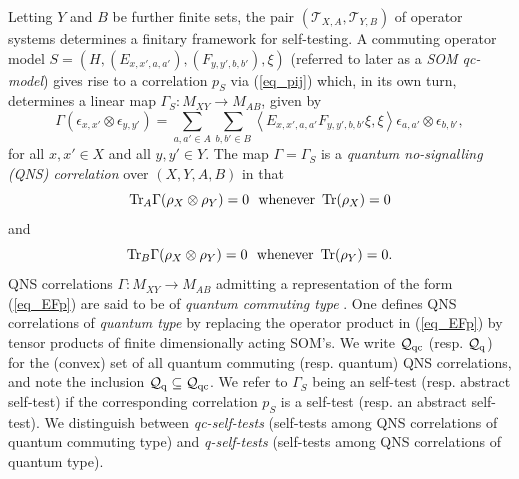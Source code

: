 \documentclass[11pt]{amsart}
\theoremstyle{definition}
\newcommand{\cl}[1]{\mathcal{#1}}
\DeclareMathOperator{\Tr}{Tr}
\begin{document}
Letting $Y$ and $B$ be further finite sets, 
the pair $(\cl T_{X,A},\cl T_{Y,B})$ of operator systems 
determines a finitary framework for self-testing. 
A commuting operator model 
$S = (H,(E_{x,x',a,a'}), (F_{y,y',b,b'}), \xi)$
(referred to later as a \emph{SOM qc-model})
gives rise to a correlation $p_S$ via (\ref{eq_pij}) which, 
in its own turn, determines a
linear map $\Gamma_S : M_{XY}\to M_{AB}$, given by 
\begin{equation}\label{eq_EFp}
\Gamma(\epsilon_{x,x'} \otimes \epsilon_{y,y'}) = \sum_{a,a'\in A} \sum_{b,b'\in B}
\left\langle E_{x,x',a,a'}F_{y,y',b,b'}\xi,\xi \right\rangle \epsilon_{a,a'} \otimes \epsilon_{b,b'}, 
\end{equation}
for all $x,x' \in X$ and all $y,y' \in Y$.
The map $\Gamma = \Gamma_S$ is a 
\emph{quantum no-signalling (QNS) correlation} over $(X,Y,A,B)$ 
\cite{dw} in that 
\begin{equation}\label{eq_NSQne1}
\Tr\hspace{-0.07cm}\mbox{}_A\Gamma(\rho_X\otimes \rho_Y) = 0 \ \mbox{ whenever } \Tr(\rho_X) = 0
\end{equation}
and
\begin{equation}\label{eq_NSQne2}
\Tr\hspace{-0.07cm}\mbox{}_B\Gamma(\rho_X\otimes \rho_Y) = 0 \ \mbox{ whenever } \Tr(\rho_Y) = 0.
\end{equation}
QNS correlations $\Gamma : M_{XY}\to M_{AB}$ admitting a 
representation of the form (\ref{eq_EFp}) are said to be of 
\emph{quantum commuting type} \cite{tt-QNS}.
One defines QNS correlations of \emph{quantum type}
by replacing the operator product in (\ref{eq_EFp}) by 
tensor products of finite dimensionally acting SOM's. 
We write $\cl Q_{\rm qc}$ (resp. $\cl Q_{\rm q}$) for the (convex) set of all quantum commuting (resp. quantum) QNS correlations, and note the inclusion 
$\cl Q_{\rm q}\subseteq \cl Q_{\rm qc}$.
We refer to $\Gamma_S$ being an self-test 
(resp. abstract self-test) if the corresponding 
correlation $p_S$ is a self-test (resp. an abstract self-test). 
We distinguish between 
\emph{qc-self-tests} (self-tests among QNS correlations of 
quantum commuting type) and \emph{q-self-tests}
(self-tests among QNS correlations of quantum type). 
\end{document}
